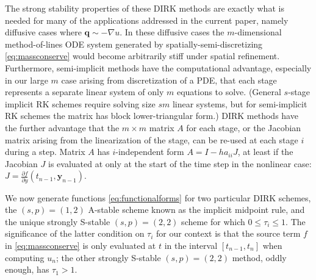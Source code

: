 \documentclass[final,leqno,onefignum,onetabnum]{siamltex1213bueler}
\newcommand\bq{\mathbf{q}}
\newcommand\by{\mathbf{y}}
\renewcommand{\grad}{\nabla}
\begin{document}
The strong stability properties of these DIRK methods are exactly what is needed for many of the applications addressed in the current paper, namely diffusive cases where $\bq \sim - \grad u$.  In these diffusive cases the $m$-dimensional method-of-lines ODE system generated by spatially-semi-discretizing \eqref{eq:massconserve} would become arbitrarily stiff under spatial refinement.  Furthermore, semi-implicit methods have the computational advantage, especially in our large $m$ case arising from discretization of a PDE, that each stage represents a separate linear system of only $m$ equations to solve.  (General $s$-stage implicit RK schemes require solving size $sm$ linear systems, but for semi-implicit RK schemes the matrix has block lower-triangular form.)  DIRK methods have the further advantage that the $m\times m$ matrix $A$ for each stage, or the Jacobian matrix arising from the linearization of the stage, can be re-used at each stage $i$ during a step.  Matrix $A$ has $i$-independent form $A = I - h a_{ii} J$, at least if the Jacobian $J$ is evaluated at only at the start of the time step in the nonlinear case: $J = \frac{\partial f}{\partial y}(t_{n-1},\by_{n-1})$.

We now generate functions \eqref{eq:functionalforms} for two particular DIRK schemes, the $(s,p)=(1,2)$ A-stable scheme known as the implicit midpoint rule, and the unique strongly S-stable $(s,p)=(2,2)$ scheme for which $0\le \tau_i\le 1$.  The significance of the latter condition on $\tau_i$ for our context is that the source term $f$ in \eqref{eq:massconserve} is only evaluated at $t$ in the interval $[t_{n-1},t_n]$ when computing $u_n$; the other strongly S-stable $(s,p)=(2,2)$ method, oddly enough, has $\tau_1>1$.
\end{document}
